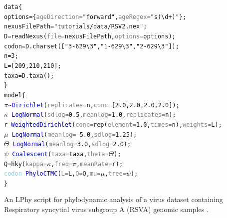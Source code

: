 \documentclass[10pt,letterpaper,table]{article}
\theoremstyle{definition}
\begin{document}
{
  \small
  \begin{example}
    \begin{alltt}
      data \{
      \quad options = \{\textcolor{gray}{ageDirection=}\textcolor{constant}{"forward"}, \textcolor{gray}{ageRegex=}\textcolor{constant}{"s(\textbackslash{}d+)"}\};
      \quad nexusFilePath = \textcolor{constant}{"tutorials/data/RSV2.nex"};
      \quad D = \textcolor{generator}{readNexus}(\textcolor{gray}{file=}nexusFilePath, \textcolor{gray}{options=}options);
      \quad codon = D.\textcolor{generator}{charset}([\textcolor{constant}{"3-629\textbackslash{}3"}, \textcolor{constant}{"1-629\textbackslash{}3"}, \textcolor{constant}{"2-629\textbackslash{}3"}]);
      \quad n = \textcolor{constant}{3};
      \quad L = [\textcolor{constant}{209}, \textcolor{constant}{210}, \textcolor{constant}{210}];
      \quad taxa = D.\textcolor{generator}{taxa}();
      \}
      model \{
      \quad \textcolor{bluishgreen}{\(\pi\)} \textasciitilde \textcolor{blue}{Dirichlet}(\textcolor{gray}{replicates=}n, \textcolor{gray}{conc=}[\textcolor{constant}{2.0}, \textcolor{constant}{2.0}, \textcolor{constant}{2.0}, \textcolor{constant}{2.0}]);
      \quad \textcolor{bluishgreen}{\(\kappa\)} ~ \textcolor{blue}{LogNormal}(\textcolor{gray}{sdlog=}\textcolor{constant}{0.5}, \textcolor{gray}{meanlog=}\textcolor{constant}{1.0}, \textcolor{gray}{replicates=}n);
      \quad \textcolor{bluishgreen}{r} ~ \textcolor{blue}{WeightedDirichlet}(\textcolor{gray}{conc=}\textcolor{generator}{rep}(\textcolor{gray}{element=}\textcolor{constant}{1.0}, \textcolor{gray}{times=}n), \textcolor{gray}{weights=}L);
      \quad \textcolor{bluishgreen}{\(\mu\)} ~ \textcolor{blue}{LogNormal}(\textcolor{gray}{meanlog=}\textcolor{constant}{-5.0}, \textcolor{gray}{sdlog=}\textcolor{constant}{1.25});
      \quad \textcolor{bluishgreen}{\(\Theta\)} ~ \textcolor{blue}{LogNormal}(\textcolor{gray}{meanlog=}\textcolor{constant}{3.0}, \textcolor{gray}{sdlog=}\textcolor{constant}{2.0});
      \quad \textcolor{bluishgreen}{\(\psi\)} ~ \textcolor{blue}{Coalescent}(\textcolor{gray}{taxa=}taxa, \textcolor{gray}{theta=}\textcolor{bluishgreen}{\(\Theta\)});
      \quad Q = \textcolor{generator}{hky}(\textcolor{gray}{kappa=}\textcolor{bluishgreen}{\(\kappa\)}, \textcolor{gray}{freq=}\textcolor{bluishgreen}{\(\pi\)}, \textcolor{gray}{meanRate=}\textcolor{bluishgreen}{r});
      \quad \textcolor{skyblue}{codon} ~ \textcolor{blue}{PhyloCTMC}(\textcolor{gray}{L=}L, \textcolor{gray}{Q=}Q, \textcolor{gray}{mu=}\textcolor{bluishgreen}{\(\mu\)}, \textcolor{gray}{tree=}\textcolor{bluishgreen}{\(\psi\)});
      \}
    \end{alltt}
    \caption{An LPhy script for phylodynamic analysis of a virus dataset containing Respiratory syncytial virus subgroup A (RSVA) genomic samples \cite{zlateva2004molecular, zlateva2005genetic}.
    \newline}
    \label{lphy:rsva}
  \end{example}
}
\end{document}
